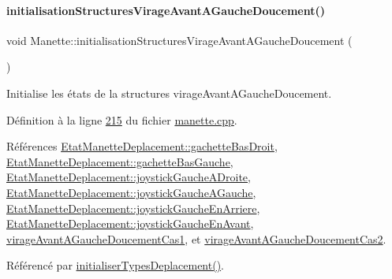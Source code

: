 \mbox{\label{class_manette_ac01c5ff122f042497658f00d3df9e859}} 
\paragraph{\texorpdfstring{initialisation\+Structures\+Virage\+Avant\+A\+Gauche\+Doucement()}{initialisationStructuresVirageAvantAGaucheDoucement()}}
{\footnotesize\ttfamily void Manette\+::initialisation\+Structures\+Virage\+Avant\+A\+Gauche\+Doucement (\begin{DoxyParamCaption}{ }\end{DoxyParamCaption})\hspace{0.3cm}{\ttfamily [private]}}



Initialise les états de la structures virage\+Avant\+A\+Gauche\+Doucement. 



Définition à la ligne \hyperlink{manette_8cpp_source_l00215}{215} du fichier \hyperlink{manette_8cpp_source}{manette.\+cpp}.



Références \hyperlink{manette_8h_source_l00185}{Etat\+Manette\+Deplacement\+::gachette\+Bas\+Droit}, \hyperlink{manette_8h_source_l00184}{Etat\+Manette\+Deplacement\+::gachette\+Bas\+Gauche}, \hyperlink{manette_8h_source_l00183}{Etat\+Manette\+Deplacement\+::joystick\+Gauche\+A\+Droite}, \hyperlink{manette_8h_source_l00182}{Etat\+Manette\+Deplacement\+::joystick\+Gauche\+A\+Gauche}, \hyperlink{manette_8h_source_l00181}{Etat\+Manette\+Deplacement\+::joystick\+Gauche\+En\+Arriere}, \hyperlink{manette_8h_source_l00180}{Etat\+Manette\+Deplacement\+::joystick\+Gauche\+En\+Avant}, \hyperlink{manette_8h_source_l00234}{virage\+Avant\+A\+Gauche\+Doucement\+Cas1}, et \hyperlink{manette_8h_source_l00235}{virage\+Avant\+A\+Gauche\+Doucement\+Cas2}.



Référencé par \hyperlink{manette_8cpp_source_l00085}{initialiser\+Types\+Deplacement()}.


